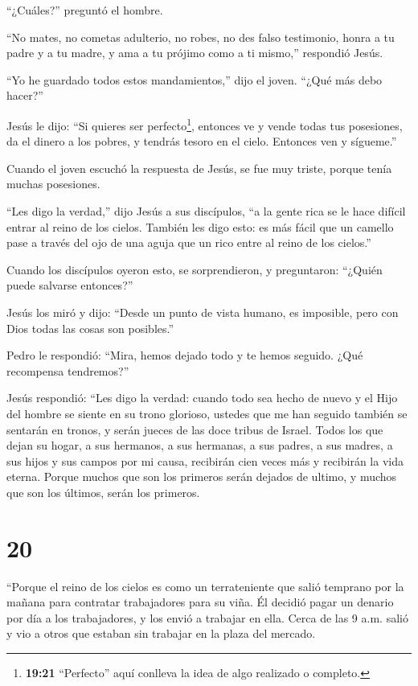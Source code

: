  ``¿Cuáles?'' preguntó el hombre.

``No mates, no cometas adulterio, no robes, no des falso testimonio,
 honra a tu padre y a tu madre, y ama a tu prójimo como a
ti mismo,'' respondió Jesús.

 ``Yo he guardado todos estos mandamientos,'' dijo el
joven. ``¿Qué más debo hacer?''

 Jesús le dijo: ``Si quieres ser perfecto\footnote{\textbf{19:21}
  ``Perfecto'' aquí conlleva la idea de algo realizado o completo.},
entonces ve y vende todas tus posesiones, da el dinero a los pobres, y
tendrás tesoro en el cielo. Entonces ven y sígueme.''

 Cuando el joven escuchó la respuesta de Jesús, se fue muy
triste, porque tenía muchas posesiones.

 ``Les digo la verdad,'' dijo Jesús a sus discípulos, ``a
la gente rica se le hace difícil entrar al reino de los cielos.
 También les digo esto: es más fácil que un camello pase a
través del ojo de una aguja que un rico entre al reino de los cielos.''

 Cuando los discípulos oyeron esto, se sorprendieron, y
preguntaron: ``¿Quién puede salvarse entonces?''

 Jesús los miró y dijo: ``Desde un punto de vista humano,
es imposible, pero con Dios todas las cosas son posibles.''

 Pedro le respondió: ``Mira, hemos dejado todo y te hemos
seguido. ¿Qué recompensa tendremos?''

 Jesús respondió: ``Les digo la verdad: cuando todo sea
hecho de nuevo y el Hijo del hombre se siente en su trono glorioso,
ustedes que me han seguido también se sentarán en tronos, y serán jueces
de las doce tribus de Israel.  Todos los que dejan su
hogar, a sus hermanos, a sus hermanas, a sus padres, a sus madres, a sus
hijos y sus campos por mi causa, recibirán cien veces más y recibirán la
vida eterna.  Porque muchos que son los primeros serán
dejados de ultimo, y muchos que son los últimos, serán los primeros.

\hypertarget{section-19}{%
\section{20}\label{section-19}}

 ``Porque el reino de los cielos es como un terrateniente
que salió temprano por la mañana para contratar trabajadores para su
viña.  Él decidió pagar un denario por día a los
trabajadores, y los envió a trabajar en ella.  Cerca de las
9 a.m. salió y vio a otros que estaban sin trabajar en la plaza del
mercado.

